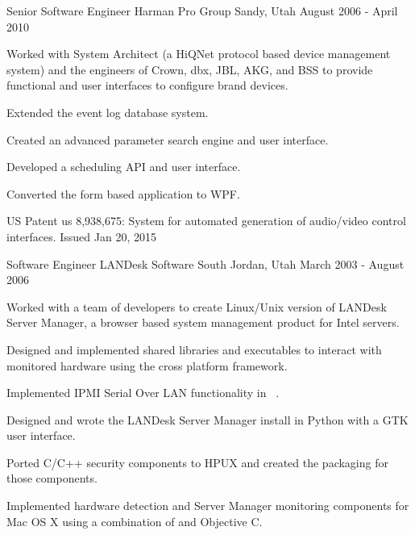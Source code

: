 \cventry
{Senior Software Engineer} %
{Harman Pro Group} %
{Sandy, Utah} %
{August 2006 - April 2010} %
{
	\begin{cvitems} %
		\item {Worked with System Architect (a HiQNet protocol based device management system) and the engineers of Crown, dbx, JBL, AKG, and BSS to provide functional and user interfaces to configure brand devices.}
		\item {Extended the event log database system.}
		\item {Created an advanced parameter search engine and user interface.}
		\item {Developed a scheduling API and user interface.}
		\item {Converted the \Csh{} form based application to WPF.}
		\item {US Patent us 8,938,675: System for automated generation of audio/video control interfaces. Issued Jan 20, 2015}
	\end{cvitems}
}

\cventry
{Software Engineer} %
{LANDesk Software} %
{South Jordan, Utah} %
{March 2003 - August 2006} %
{
	\begin{cvitems} %
		\item {Worked with a team of developers to create Linux/Unix version of LANDesk Server Manager, a browser based system management product for Intel servers.}
		\item {Designed and implemented shared libraries and executables to interact with monitored hardware using the cross platform \Cpp{} framework.}
		\item {Implemented IPMI Serial Over LAN functionality in \
			\Cpp{}.}
		\item {Designed and wrote the LANDesk Server Manager install in Python with a GTK user interface.}
		\item {Ported C/C++ security components to HPUX and created the packaging for those components.}
		\item {Implemented hardware detection and Server Manager monitoring components for Mac OS X using a combination of \Cpp{} and Objective C.}
	\end{cvitems}
}


